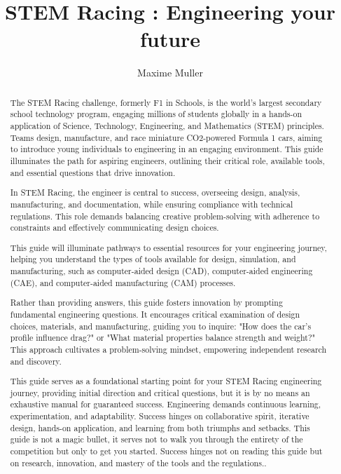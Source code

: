 \documentclass[a4paper]{report}
\author{Maxime Muller}
\title{STEM Racing : Engineering your future}
\begin{document}
\maketitle

\begin{abstract}
The STEM Racing challenge, formerly F1 in Schools, is the world's largest secondary school technology program, engaging millions of students globally in a hands-on application of Science, Technology, Engineering, and Mathematics (STEM) principles. Teams design, manufacture, and race miniature CO2-powered Formula 1 cars, aiming to introduce young individuals to engineering in an engaging environment. This guide illuminates the path for aspiring engineers, outlining their critical role, available tools, and essential questions that drive innovation. \par

In STEM Racing, the engineer is central to success, overseeing design, analysis, manufacturing, and documentation, while ensuring compliance with technical regulations. This role demands balancing creative problem-solving with adherence to constraints and effectively communicating design choices. \par

This guide will illuminate pathways to essential resources for your engineering journey, helping you understand the types of tools available for design, simulation, and manufacturing, such as computer-aided design (CAD), computer-aided engineering (CAE), and computer-aided manufacturing (CAM) processes. \par

Rather than providing answers, this guide fosters innovation by prompting fundamental engineering questions. It encourages critical examination of design choices, materials, and manufacturing, guiding you to inquire: "How does the car's profile influence drag?" or "What material properties balance strength and weight?" This approach cultivates a problem-solving mindset, empowering independent research and discovery. \par

This guide serves as a foundational starting point for your STEM Racing engineering journey, providing initial direction and critical questions, but it is by no means an exhaustive manual for guaranteed success. Engineering demands continuous learning, experimentation, and adaptability. Success hinges on collaborative spirit, iterative design, hands-on application, and learning from both triumphs and setbacks. This guide is not a magic bullet, it serves not to walk you through the entirety of the competition but only to get you started. Success hinges not on reading this guide but on research, innovation, and mastery of the tools and the regulations.. 

\end{abstract}

\newpage

\tableofcontents

\end{document}
